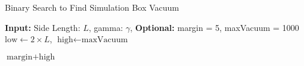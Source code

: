 \begin{algorithm}[H]
\caption{Binary Search to Find Simulation Box Vacuum}
\label{alg:vacuum}
\textbf{Input:} Side Length: $L$, gamma: $\gamma$, \textbf{Optional: }margin = 5, maxVacuum = 1000 \\
$\text{low} \gets 2 \times L$,
$\text{high} \gets \text{maxVacuum}$

\Return $\text{margin} + \text{high} $\;
\end{algorithm}